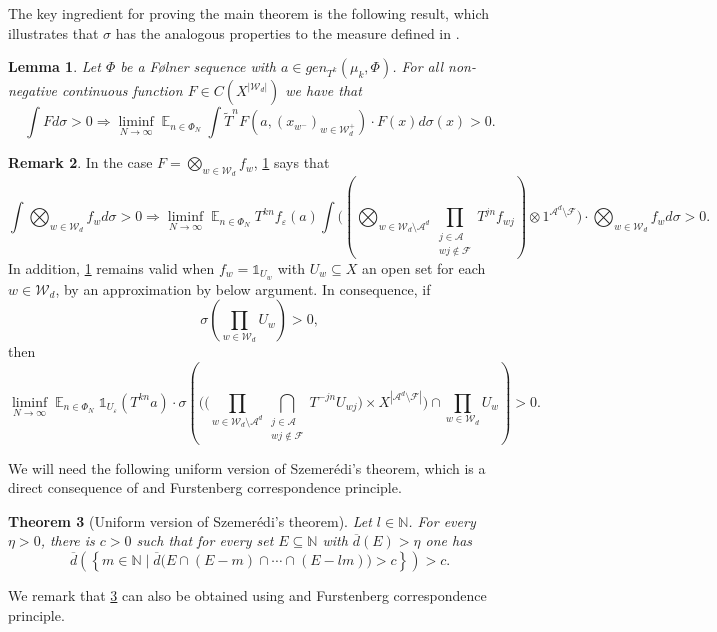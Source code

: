 \documentclass[letter,11pt]{article}
\newtheorem{theo}{Theorem}[section]
\newtheorem{lemma}[theo]{Lemma}
\theoremstyle{definition}
\newtheorem{remark}[theo]{Remark}
\newcommand{\N}{\mathbb{N}}
\newcommand{\sF}{\mathcal{F}}
\newcommand{\sA}{\mathcal{A}}
\newcommand{\bE}{\mathop{\mathbb{E}}}
\newcommand{\ind}[1]{\mathbb{1}_{#1}}
\begin{document}
The key ingredient for proving the main theorem is the following result, which illustrates that $\sigma$ has the analogous properties to the measure defined in \cite[Definition 3.1]{kmrr25}.
\begin{lemma}\label{Lemma-new-method}
    Let $\Phi$ be a F\o lner sequence with $a\in gen_{T^k}(\mu_k,\Phi)$. For all non-negative continuous function $F\in C(X^{|\mathcal{W}_d|})$ we have that
    \begin{equation*}
        \int F d\sigma >0 \Rightarrow
   \liminf_{N\to\infty} \bE_{n\in \Phi_N}\int    \tilde{T}^n F\left(a, (x_{w^-})_{w\in \mathcal{W}_{d}^{+}} \right)\cdot F(x)  d\sigma(x) >0.
    \end{equation*}
\end{lemma}
\begin{remark}\label{useful-remark}
    In the case $F=\bigotimes_{w\in \mathcal{W}_d} f_w$, \cref{Lemma-new-method} says that
    $$\int \bigotimes_{w\in \mathcal{W}_d} f_w d\sigma >0 \Rightarrow    \liminf_{N\to\infty} \bE_{n\in \Phi_N}T^{kn} f_\varepsilon(a) \int  \Big( (\bigotimes_{w\in \mathcal{W}_{d}\setminus\sA^d}  \prod_{\substack{j\in\sA\\wj\notin \sF}} T^{jn}f_{wj} )\otimes 1^{\sA^d\setminus \sF} \Big) \cdot \bigotimes_{w\in \mathcal{W}_d}f_{w}d\sigma>0.  $$
    In addition, \cref{Lemma-new-method} remains valid when $f_w=\ind{U_w}$ with $U_w\subseteq X$ an open set for each $w\in \mathcal{W}_d$, by an approximation by below argument. In consequence, if
    $$\sigma\left(\prod_{w\in \mathcal{W}_d} U_w\right)>0, $$
    then $$\liminf_{N\to\infty} \bE_{n\in \Phi_N} \ind{U_\varepsilon}(T^{kn}a)\cdot  \sigma\left(\Bigg( \Big(\prod_{w\in \mathcal{W}_{d}\setminus\sA^d} \bigcap_{\substack{j\in \sA \\ wj\notin \sF}}T^{-jn} U_{wj} \Big)\times X^{|\mathcal{A}^d\setminus \sF|} \Bigg)\cap \prod_{w\in \mathcal{W}_d} U_w  \right)>0. $$
\end{remark}
We will need the following uniform version of Szemerédi's theorem, which is a direct consequence of \cite[Theorem A.2]{BKLR19} and Furstenberg correspondence principle.
\begin{theo}[Uniform version of Szemerédi's theorem]\label{Uniform-Szemeredi}
Let $l\in \N$. For every $\eta>0$, there is $c>0$ such that for every set $E\subseteq \N$ with $\overline{d}(E)>\eta$ one has
$$\overline{d}\left(\left\{m\in \N \mid \overline{d}\Big(E\cap (E-m)\cap \cdots\cap (E-lm)\Big)>c \right\}\right)>c. $$
\end{theo}
We remark that \cref{Uniform-Szemeredi} can also be obtained using \cite[Theorem F2 and Theorem 2.1]{MR1784213} and Furstenberg correspondence principle.
\end{document}
